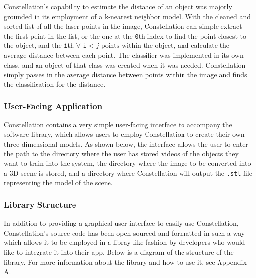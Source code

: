 Constellation's capability to estimate the distance of an object was majorly grounded in its employment of a k-nearest neighbor model. With the cleaned and sorted list of all the laser points in the image, Constellation can simple extract the first point in the list, or the one at the \texttt{0}th index to find the point closest to the object, and the \texttt{i}th $\forall \texttt{ i}<j\text{ points within the object}$, and calculate the average distance between each point. The classifier was implemented in its own class, and an object of that class was created when it was needed. Constellation simply passes in the average distance between points within the image and finds the classification for the distance.
\subsubsection{User-Facing Application}
Constellation contains a very simple user-facing interface to accompany the software library, which allows users to employ Constellation to create their own three dimensional models. As shown below, the interface allows the user to enter the path to the directory where the user has stored videos of the objects they want to train into the system, the directory where the image to be converted into a 3D scene is stored, and a directory where Constellation will output the \texttt{.stl} file representing the model of the scene.
\subsubsection{Library Structure}
In addition to providing a graphical user interface to easily use Constellation, Constellation's source code has been open sourced and formatted in such a way which allows it to be employed in a libray-like fashion by developers who would like to integrate it into their app. Below is a diagram of the structure of the library. For more information about the library and how to use it, see Appendix A.\\



